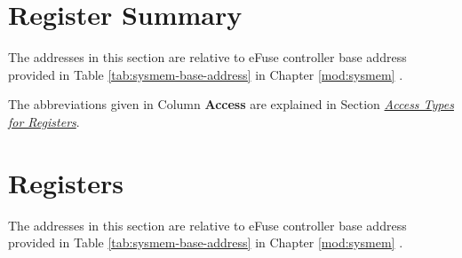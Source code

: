 \documentclass[main\_\_EN.tex]{subfiles}
\begin{document}


\clearpage
\hypertarget{efuse-reg-summ}{}
\section{Register Summary}
\label{sec:efuse-reg-summ}

The addresses in this section are relative to eFuse controller base address provided in Table \ref{tab:sysmem-base-address} in Chapter \ref{mod:sysmem} \textit{}.

The abbreviations given in Column \textbf{Access} are explained in Section \hyperref[glossary-access-types]{\textit{Access Types for Registers}}.






\clearpage
\section{Registers}

The addresses in this section are relative to eFuse controller base address provided in Table \ref{tab:sysmem-base-address} in Chapter \ref{mod:sysmem} \textit{}.


\end{document}
